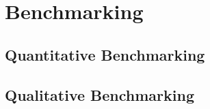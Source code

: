 \section{Benchmarking}

\subsection{Quantitative Benchmarking}
\subsection{Qualitative Benchmarking}
